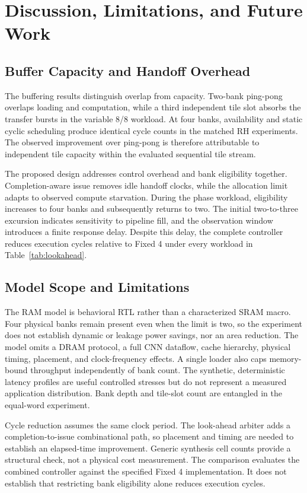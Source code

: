 \documentclass[twocolumn,10pt]{article}
\begin{document}
\section{Discussion, Limitations, and Future Work}
\subsection{Buffer Capacity and Handoff Overhead}
The buffering results distinguish overlap from capacity. Two-bank
ping-pong overlaps loading and computation, while a third independent tile
slot absorbs the transfer bursts in the variable 8/8 workload. At four
banks, availability and static cyclic scheduling produce identical cycle
counts in the matched RH experiments. The observed improvement over
ping-pong is therefore attributable to independent tile capacity within
the evaluated sequential tile stream.

The proposed design addresses control overhead and bank eligibility
together. Completion-aware issue removes idle handoff clocks, while the
allocation limit adapts to observed compute starvation. During the phase
workload, eligibility increases to four banks and subsequently returns to
two. The initial two-to-three excursion indicates sensitivity to pipeline
fill, and the observation window introduces a finite response delay.
Despite this delay, the complete controller reduces execution cycles
relative to Fixed 4 under every workload in Table~\ref{tab:lookahead}.

\subsection{Model Scope and Limitations}
The RAM model is behavioral RTL rather than a characterized SRAM macro. Four
physical banks remain present even when the limit is two, so the experiment
does not establish dynamic or leakage power savings, nor an area reduction.
The model omits a DRAM protocol, a full CNN dataflow, cache hierarchy,
physical timing, placement, and clock-frequency effects. A single loader
also caps memory-bound throughput independently of bank count. The
synthetic, deterministic latency profiles are useful controlled stresses
but do not represent a measured application distribution. Bank depth and
tile-slot count are entangled in the equal-word experiment.

Cycle reduction assumes the same clock period. The look-ahead arbiter adds
a completion-to-issue combinational path, so placement and timing are
needed to establish an elapsed-time improvement. Generic synthesis cell
counts provide a structural check, not a physical cost measurement.
The comparison evaluates the combined controller against the specified
Fixed 4 implementation. It does not establish that restricting bank
eligibility alone reduces execution cycles.
\end{document}
